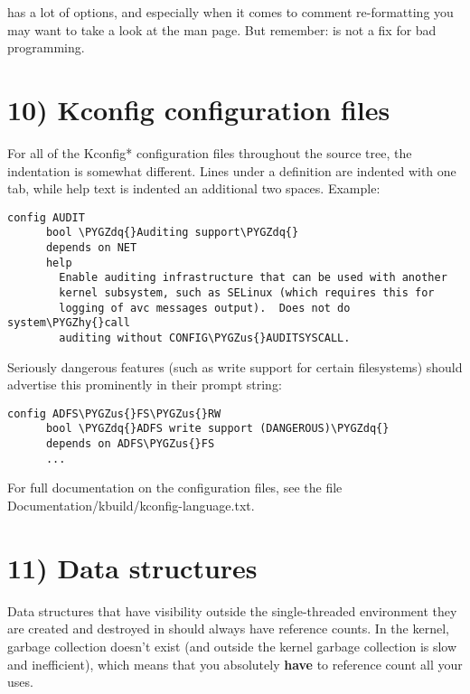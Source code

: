 \documentclass[a4paper,8pt,english]{sphinxmanual}
\def\PYGZus{\char`\_}
\def\PYGZhy{\char`\-}
\def\PYGZdq{\char`\"}
\begin{document}
 has a lot of options, and especially when it comes to comment
re-formatting you may want to take a look at the man page.  But
remember:  is not a fix for bad programming.


\section{10) Kconfig configuration files}
\label{process/coding-style:kconfig-configuration-files}
For all of the Kconfig* configuration files throughout the source tree,
the indentation is somewhat different.  Lines under a  definition
are indented with one tab, while help text is indented an additional two
spaces.  Example:

\begin{Verbatim}[commandchars=\\\{\}]
config AUDIT
      bool \PYGZdq{}Auditing support\PYGZdq{}
      depends on NET
      help
        Enable auditing infrastructure that can be used with another
        kernel subsystem, such as SELinux (which requires this for
        logging of avc messages output).  Does not do system\PYGZhy{}call
        auditing without CONFIG\PYGZus{}AUDITSYSCALL.
\end{Verbatim}

Seriously dangerous features (such as write support for certain
filesystems) should advertise this prominently in their prompt string:

\begin{Verbatim}[commandchars=\\\{\}]
config ADFS\PYGZus{}FS\PYGZus{}RW
      bool \PYGZdq{}ADFS write support (DANGEROUS)\PYGZdq{}
      depends on ADFS\PYGZus{}FS
      ...
\end{Verbatim}

For full documentation on the configuration files, see the file
Documentation/kbuild/kconfig-language.txt.


\section{11) Data structures}
\label{process/coding-style:data-structures}
Data structures that have visibility outside the single-threaded
environment they are created and destroyed in should always have
reference counts.  In the kernel, garbage collection doesn't exist (and
outside the kernel garbage collection is slow and inefficient), which
means that you absolutely \textbf{have} to reference count all your uses.
\end{document}
